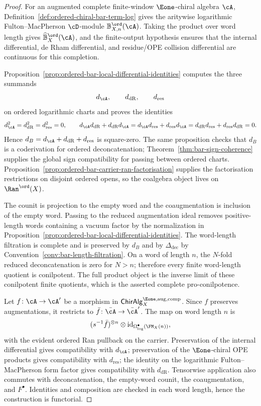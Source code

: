 \begin{proof}
For an augmented complete finite-window \(\Eone\)-chiral algebra
\(\cA\), Definition~\ref{def:ordered-chiral-bar-term-log} gives the
aritywise logarithmic Fulton--MacPherson \(\cD\)-module
\(\mathbb B^{\ord}_{X,n}(\cA)\). Taking the product over word length
gives \(\widehat{\mathbb B}^{\ord}_X(\cA)\), and the finite-output
hypothesis ensures that the internal differential, de Rham
differential, and residue/OPE collision differential are continuous
for this completion.

Proposition~\ref{prop:ordered-bar-local-differential-identities}
computes the three summands
\[
d_\cA,\qquad d_{\mathrm{dR}},\qquad d_{\mathrm{res}}
\]
on ordered logarithmic charts and proves the identities
\[
d_\cA^2=d_{\mathrm{dR}}^2=d_{\mathrm{res}}^2=0,\qquad
d_\cA d_{\mathrm{dR}}+d_{\mathrm{dR}}d_\cA=
d_\cA d_{\mathrm{res}}+d_{\mathrm{res}}d_\cA=
d_{\mathrm{dR}}d_{\mathrm{res}}+d_{\mathrm{res}}d_{\mathrm{dR}}=0.
\]
Hence \(d_B=d_\cA+d_{\mathrm{dR}}+d_{\mathrm{res}}\) is square-zero.
The same proposition checks that \(d_B\) is a coderivation for
ordered deconcatenation; Theorem~\ref{thm:bar-sign-coherence} supplies
the global sign compatibility for passing between ordered charts.
Proposition~\ref{prop:ordered-bar-carrier-ran-factorisation} supplies
the factorisation restrictions on disjoint ordered opens, so the
coalgebra object lives on \(\Ran^{\ord}(X)\).

The counit is projection to the empty word and the coaugmentation is
inclusion of the empty word. Passing to the reduced augmentation ideal
removes positive-length words containing a vacuum factor by the
normalization in
Proposition~\ref{prop:ordered-bar-local-differential-identities}. The
word-length filtration is complete and is preserved by \(d_B\) and by
\(\Delta_{\mathrm{dec}}\) by
Convention~\ref{conv:bar-length-filtration}. On a word of length
\(n\), the \(N\)-fold reduced deconcatenation is zero for \(N>n\);
therefore every finite word-length quotient is conilpotent. The full
product object is the inverse limit of these conilpotent finite
quotients, which is the asserted complete pro-conilpotence.

Let \(f\colon\cA\to\cA'\) be a morphism in
\(\mathsf{ChirAlg}^{\Eone,\mathrm{aug,comp}}_X\). Since \(f\) preserves
augmentations, it restricts to \(\bar f\colon\bar\cA\to\bar\cA'\). The
map on word length \(n\) is
\[
(s^{-1}\bar f)^{\otimes n}\otimes
\mathrm{id}_{\Omega^\bullet_{\log}(\FM_X(n))},
\]
with the evident ordered Ran pullback on the carrier. Preservation of
the internal differential gives compatibility with \(d_\cA\);
preservation of the \(\Eone\)-chiral OPE products gives compatibility
with \(d_{\mathrm{res}}\); the identity on the logarithmic
Fulton--MacPherson form factor gives compatibility with
\(d_{\mathrm{dR}}\). Tensorwise application also commutes with
deconcatenation, the empty-word counit, the coaugmentation, and
\(F^\bullet\). Identities and composition are checked in each word
length, hence the construction is functorial.


\end{proof}
